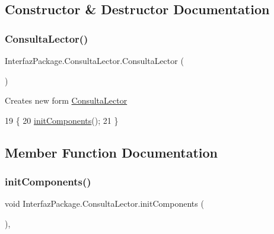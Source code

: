 \subsection{Constructor \& Destructor Documentation}
\mbox{\label{class_interfaz_package_1_1_consulta_lector_aada092751d0db60c4a1b6fcde682d30b}} 
\subsubsection{\texorpdfstring{Consulta\+Lector()}{ConsultaLector()}}
{\footnotesize\ttfamily Interfaz\+Package.\+Consulta\+Lector.\+Consulta\+Lector (\begin{DoxyParamCaption}{ }\end{DoxyParamCaption})\hspace{0.3cm}{\ttfamily [inline]}}

Creates new form \mbox{\hyperlink{class_interfaz_package_1_1_consulta_lector}{Consulta\+Lector}} 
\begin{DoxyCode}
19                             \{
20         \mbox{\hyperlink{class_interfaz_package_1_1_consulta_lector_a44ed42879c7267fed30baff36bedb921}{initComponents}}();
21     \}
\end{DoxyCode}


\subsection{Member Function Documentation}
\mbox{\label{class_interfaz_package_1_1_consulta_lector_a44ed42879c7267fed30baff36bedb921}} 
\subsubsection{\texorpdfstring{init\+Components()}{initComponents()}}
{\footnotesize\ttfamily void Interfaz\+Package.\+Consulta\+Lector.\+init\+Components (\begin{DoxyParamCaption}{ }\end{DoxyParamCaption})\hspace{0.3cm}{\ttfamily [inline]}, {\ttfamily [private]}}

